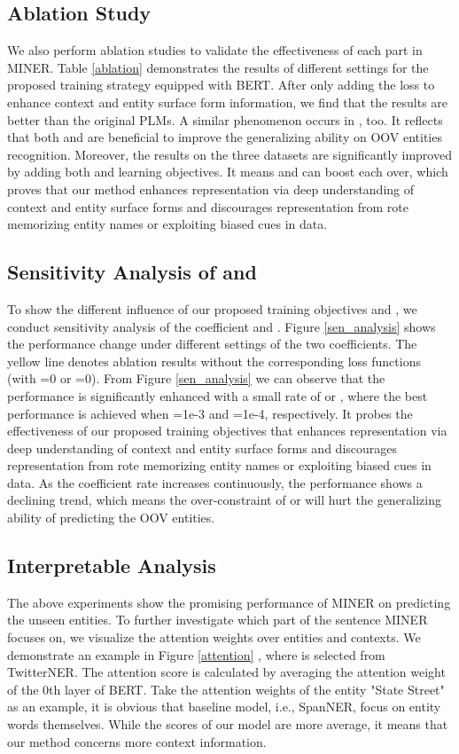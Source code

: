 \documentclass[11pt]{article}
\begin{document}
\subsection{Ablation Study}
We also perform ablation studies to validate the effectiveness of each part in MINER. Table \ref{ablation} demonstrates the results of different settings for the proposed training strategy equipped with BERT. After only adding the  loss to enhance context and entity surface form information, we find that the results are better than the original PLMs. A similar phenomenon occurs in , too. It reflects that both  and  are beneficial to improve the generalizing ability on OOV entities recognition. Moreover, the results on the three datasets are significantly improved by adding both  and  learning objectives. It means  and  can boost each over, which proves that our method enhances representation via deep understanding of context and entity surface forms and discourages representation from rote memorizing entity names or exploiting biased cues in data.


\subsection{Sensitivity Analysis of  and }

To show the different influence of our proposed training objectives  and , we conduct sensitivity analysis of the coefficient  and . Figure \ref{sen_analysis} shows the performance change under different settings of the two coefficients. The yellow line denotes ablation results without the corresponding loss functions (with =0 or =0). From Figure \ref{sen_analysis} we can observe that the performance is significantly enhanced with a small rate of  or , where the best performance is achieved when =1e-3 and =1e-4, respectively. It probes the effectiveness of our proposed training objectives that enhances representation via deep understanding of context and entity surface forms and discourages representation from rote memorizing entity names or exploiting biased cues in data. As the coefficient rate increases continuously, the performance shows a declining trend, which means the over-constraint of  or  will hurt the generalizing ability of predicting the OOV entities.







\subsection{Interpretable Analysis}
The above experiments show the promising performance of MINER on predicting the unseen entities. To further investigate which part of the sentence MINER focuses on, we visualize the attention weights over entities and contexts. We demonstrate an example in Figure \ref{attention} , where is selected from TwitterNER. The attention score is calculated by averaging the attention weight of the 0th layer of BERT. Take the attention weights of the entity "State Street" as an example, it is obvious that baseline model, i.e., SpanNER, focus on entity words themselves. While the scores of our model are more average, it means that our method concerns more context information.  
\end{document}
